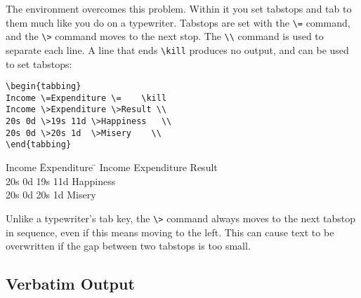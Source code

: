 The  environment overcomes this problem. Within it you set
tabstops and tab to them much like you do on a typewriter.  Tabstops are
set with the \verb|\=| command, and the \verb|\>| command moves to the
next stop.  The
\verb|\\| command is used to separate each line.  A line that ends \verb|\kill|
produces no output, and can be used to set tabstops:
\nolinebreak
\egstart
\begin{verbatim}
\begin{tabbing}
Income \=Expenditure \=    \kill
Income \>Expenditure \>Result \\
20s 0d \>19s 11d \>Happiness   \\
20s 0d \>20s 1d  \>Misery    \\
\end{tabbing}
\end{verbatim}
\egmid%
\begin{tabbing}
Income \=Expenditure \=    \kill
Income \>Expenditure \>Result \\
20s 0d \>19s 11d \>Happiness   \\
20s 0d \>20s 1d  \>Misery    \\
\end{tabbing}
\egend

Unlike a typewriter's tab key, the \verb|\>| command always moves to the next
tabstop in sequence, even if this means moving to the left.  This can cause
text to be overwritten if the gap between two tabstops is too small.

\subsection{Verbatim Output}


